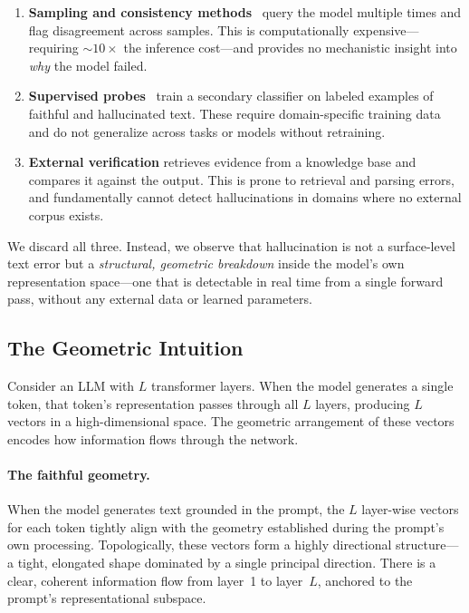 \documentclass{article}
\begin{document}
\begin{enumerate}
    \item \textbf{Sampling and consistency methods}~\citep{manakul2023selfcheckgpt} query the model multiple times and flag disagreement across samples. This is computationally expensive---requiring ${\sim}10\times$ the inference cost---and provides no mechanistic insight into \emph{why} the model failed.
    \item \textbf{Supervised probes}~\citep{azaria2023internal, burns2022discovering} train a secondary classifier on labeled examples of faithful and hallucinated text. These require domain-specific training data and do not generalize across tasks or models without retraining.
    \item \textbf{External verification} retrieves evidence from a knowledge base and compares it against the output. This is prone to retrieval and parsing errors, and fundamentally cannot detect hallucinations in domains where no external corpus exists.
\end{enumerate}

We discard all three. Instead, we observe that hallucination is not a surface-level text error but a \emph{structural, geometric breakdown} inside the model's own representation space---one that is detectable in real time from a single forward pass, without any external data or learned parameters.

\subsection{The Geometric Intuition}
\label{sec:intuition}

Consider an LLM with $L$ transformer layers. When the model generates a single token, that token's representation passes through all $L$ layers, producing $L$ vectors in a high-dimensional space. The geometric arrangement of these vectors encodes how information flows through the network.

\paragraph{The faithful geometry.}
When the model generates text grounded in the prompt, the $L$ layer-wise vectors for each token tightly align with the geometry established during the prompt's own processing. Topologically, these vectors form a highly directional structure---a tight, elongated shape dominated by a single principal direction. There is a clear, coherent information flow from layer~1 to layer~$L$, anchored to the prompt's representational subspace.
\end{document}
